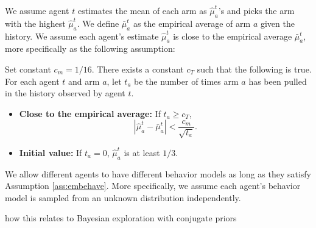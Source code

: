  We assume agent $t$ estimates the mean of each arm as $\hat{\mu}_a^t$'s and picks the arm with the highest $\hat{\mu}_a^t$. We define $\bar{\mu}_a^t$ as the empirical average of arm $a$ given the history. We assume each agent's estimate $\hat{\mu}_a^t$ is close to the empirical average $\bar{\mu}_a^t$, more specifically as the following assumption:
\begin{assumption}
\label{ass:embehave}
Set constant $c_m = 1/16$. There exists a constant $c_T$ such that the following is true. For each agent $t$ and arm $a$, let $t_a$ be the number of times arm $a$ has been pulled in the history observed by agent $t$. 
\begin{itemize}
\item \textbf{Close to the empirical average:} If $t_a \geq c_T$, 
\[
|\hat{\mu}^t_a - \bar{\mu}^t_a | < \frac{c_m}{\sqrt{t_a}}.
\]
\item \textbf{Initial value:} If $t_a = 0$, $\hat{\mu}^t_a$ is at least $1/3$. 
\end{itemize}
\end{assumption}

We allow different agents to have different behavior models as long as they satisfy Assumption \ref{ass:embehave}. More specifically, we assume each agent's behavior model is sampled from an unknown distribution independently. 
\begin{remark}
how this relates to Bayesian exploration with conjugate priors
\end{remark}